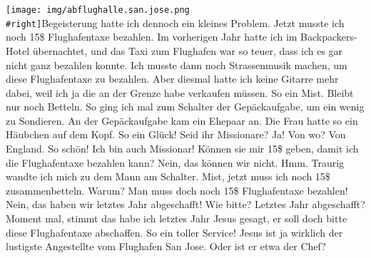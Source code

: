 \documentclass[
]{article}
\begin{document}
\texttt{[image: img/abflughalle.san.jose.png\\\#right]}Begeisterung hatte
ich dennoch ein kleines Problem. Jetzt musste ich noch 15\$
Flughafentaxe bezahlen. Im vorherigen Jahr hatte ich im
Backpackers-Hotel übernachtet, und das Taxi zum Flughafen war so teuer,
dass ich es gar nicht ganz bezahlen konnte. Ich musste dann noch
Strassenmusik machen, um diese Flughafentaxe zu bezahlen. Aber diesmal
hatte ich keine Gitarre mehr dabei, weil ich ja die an der Grenze habe
verkaufen müssen. So ein Mist. Bleibt nur noch Betteln. So ging ich mal
zum Schalter der Gepäckaufgabe, um ein wenig zu Sondieren. An der
Gepäckaufgabe kam ein Ehepaar an. Die Frau hatte so ein Häubchen auf dem
Kopf. So ein Glück! Seid ihr Missionare? Ja! Von wo? Von England. So
schön! Ich bin auch Missionar! Können sie mir 15\$ geben, damit ich die
Flughafentaxe bezahlen kann? Nein, das können wir nicht. Hmm. Traurig
wandte ich mich zu dem Mann am Schalter. Mist, jetzt muss ich noch 15\$
zusammenbetteln. Warum? Man muss doch noch 15\$ Flughafentaxe bezahlen!
Nein, das haben wir letztes Jahr abgeschafft! Wie bitte? Letztes Jahr
abgeschafft? Moment mal, stimmt das habe ich letztes Jahr Jesus gesagt,
er soll doch bitte diese Flughafentaxe abschaffen. So ein toller
Service! Jesus ist ja wirklich der lustigste Angestellte vom Flughafen
San Jose. Oder ist er etwa der Chef?
\end{document}
